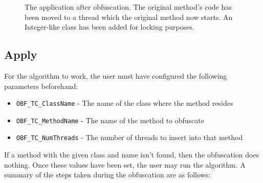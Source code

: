\begin{figure}
\begin{center}
\end{center}
\caption{The application after obfuscation.  The original method's code has 
been moved to a thread which the original method now starts.  An Integer-like
class has been added for locking purposes.}
\end{figure}  


\subsection{Apply}
For the algorithm to work, the user must have configured the following
parameters beforehand:
\begin{itemize}
  \item \texttt{OBF\_TC\_ClassName} - The name of the class where the method
        resides
  \item \texttt{OBF\_TC\_MethodName} - The name of the method to obfuscate
  \item \texttt{OBF\_TC\_NumThreads} - The number of threads to insert into that
        method
\end{itemize}

\noindent
If a method with the given class and name isn't found, then the obfuscation
does nothing.  Once these values have been set, the user may run the algorithm.  A summary of the steps taken during the obfuscation are as follows:

